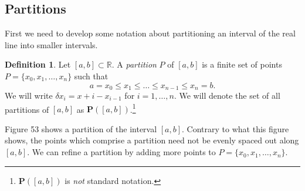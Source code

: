 \documentclass{article}
\newcommand{\R}{\mathbb{R}}
\theoremstyle{definition}
\newtheorem{definition}{Definition}[section]
\begin{document}
\subsection{Partitions}
First we need to develop some notation about partitioning an interval of the real line into smaller intervals. 
\begin{definition}
	Let $ [a,b]\subset\R $. A \textit{\color{red}partition} $ P $ of $ [a,b] $ is a finite set of points $ P=\{x_0,x_1,\ldots,x_n\} $ such that $$a=x_0\le x_1\le\ldots\le x_{n-1}\le x_n=b .$$ We will write $ \delta x_i=x+i-x_{i-1} $ for $ i=1,\ldots,n $. We will denote the set of all partitions of $ [a,b] $ as $ \textbf{P}([a,b]) $.\footnote{$ \textbf{P}([a,b]) $ is \textit{not} standard notation.} 
\end{definition}
Figure 53 shows a partition of the interval $ [a,b] $. Contrary to what this figure shows, the points which comprise a partition need not be evenly spaced out along $ [a,b] $. We can refine a partition by adding more points to $ P=\{x_0,x_1,\ldots,x_n\} $.
\end{document}
